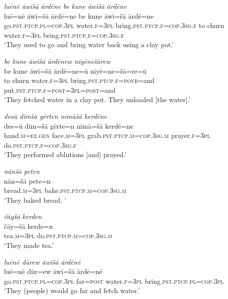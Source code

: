 \ea \label{ŽE.16}
\textit{luēnē āwīšā ārdēne be kune āwīšā ārdēne} \\ 
\gll luē=nē āwī=šā ārdē=ne be kune āwī=šā ārdē=ne \\ 
 go\textsc{.pst}\textsc{.ptcp}\textsc{.pl}\textsc{=cop}\textsc{.3pl} water\textsc{.f}\textsc{=3pl} bring\textsc{.pst}\textsc{.ptcp}\textsc{.f}\textsc{=cop}\textsc{.3sg}\textsc{.f} to churn water\textsc{.f}\textsc{=3pl} bring\textsc{.pst}\textsc{.ptcp}\textsc{.f}\textsc{=cop}\textsc{.3sg}\textsc{.f} \\ 
\glt `They used to go and bring water back using a clay pot.'
\z 
 
\ea \label{ŽE.17}
\textit{be kune āwīšā ārdēnew nīyēnešārew} \\ 
\gll be kune āwī=šā ārdē=ne=ū nīyē=ne=šā=re=ū \\ 
 to churn water\textsc{.f}\textsc{=3pl} bring\textsc{.pst}\textsc{.ptcp}\textsc{.f}\textsc{=\textsc{povb}}=and put\textsc{.pst}\textsc{.ptcp}\textsc{.f}\textsc{=\textsc{post}}\textsc{=3pl}\textsc{=\textsc{post}}=and \\ 
\glt `They fetched water in a clay pot. They unloaded [the water].'
\z 
 
\ea \label{ŽE.18}
\textit{desū dīmšā gērten nimāšā kerdēne} \\ 
\gll des=ū dīm=šā gērte=n nimā=šā kerdē=ne \\ 
 hand\textsc{.m}\textsc{\textsc{=ez.gen}} face\textsc{.m}\textsc{=3pl} grab\textsc{.pst}\textsc{.ptcp}\textsc{.m}\textsc{=cop}\textsc{.3sg}\textsc{.m} prayer\textsc{.f}\textsc{=3pl} do\textsc{.pst}\textsc{.ptcp}\textsc{.f}\textsc{=cop}\textsc{.3sg}\textsc{.f} \\ 
\glt `They performed ablutions [and] prayed.'
\z 
 
\ea \label{ŽE.19}
\textit{nānšā peten} \\ 
\gll nān=šā pete=n \\ 
 bread\textsc{.m}\textsc{=3pl} bake\textsc{.pst}\textsc{.ptcp}\textsc{.m}\textsc{=cop}\textsc{.3sg}\textsc{.m} \\ 
\glt `They baked bread. '
\z 
 
\ea \label{ŽE.20}
\textit{čāyšā kerden} \\ 
\gll čāy=šā kerde=n \\ 
 tea\textsc{.m}\textsc{=3pl} do\textsc{.pst}\textsc{.ptcp}\textsc{.m}\textsc{=cop}\textsc{.3sg}\textsc{.m} \\ 
\glt `They made tea.'
\z 
 
\ea \label{ŽE.24}
\textit{luēnē dūrew āwīšā ārdēnē} \\ 
\gll luē=nē dūr=ew āwī=šā ārdē=nē \\ 
 go\textsc{.pst}\textsc{.ptcp}\textsc{.pl}\textsc{=cop}\textsc{.3pl} far\textsc{=\textsc{post}} water\textsc{.f}\textsc{=3pl} bring\textsc{.pst}\textsc{.ptcp}\textsc{.pl}\textsc{=cop}\textsc{.3pl} \\ 
\glt `They (people) would go far and fetch water.'
\z 
 
